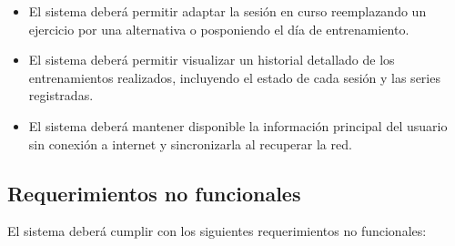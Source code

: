 \begin{itemize}
    \item El sistema deberá permitir adaptar la sesión en curso reemplazando un ejercicio por una alternativa o posponiendo el día de entrenamiento.

    \item El sistema deberá permitir visualizar un historial detallado de los entrenamientos realizados, incluyendo el estado de cada sesión y las series registradas.

    \item El sistema deberá mantener disponible la información principal del usuario sin conexión a internet y sincronizarla al recuperar la red.
\end{itemize}

\subsection{Requerimientos no funcionales}

El sistema deberá cumplir con los siguientes requerimientos no funcionales:

